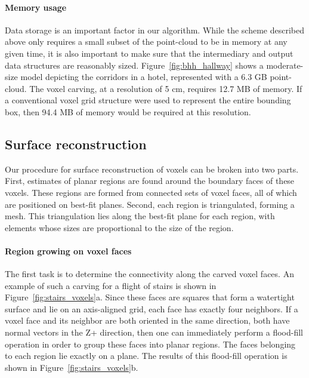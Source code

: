 \documentclass[10pt,twocolumn,letterpaper]{article}
\begin{document}
\paragraph*{Memory usage}

Data storage is an important factor in our algorithm.  While the scheme described above only requires a small subset of the point-cloud to be in memory at any given time, it is also important to make sure that the intermediary and output data structures are reasonably sized.  Figure~\ref{fig:bhh_hallway} shows a moderate-size model depicting the corridors in a hotel, represented with a 6.3 GB point-cloud.  The voxel carving, at a resolution of 5 cm, requires 12.7 MB of memory.  If a conventional voxel grid structure were used to represent the entire bounding box, then 94.4 MB of memory would be required at this resolution.

\subsection{Surface reconstruction}
\label{sec:surface}


Our procedure for surface reconstruction of voxels can be broken into two parts.  First, estimates of planar regions are found around the boundary faces of these voxels.  These regions are formed from connected sets of voxel faces, all of which are positioned on best-fit planes.  Second, each region is triangulated, forming a mesh.  This triangulation lies along the best-fit plane for each region, with elements whose sizes are proportional to the size of the region.

\paragraph*{Region growing on voxel faces}

The first task is to determine the connectivity along the carved voxel faces. An example of such a carving for a flight of stairs is shown in Figure~\ref{fig:stairs_voxels}a.  Since these faces are squares that form a watertight surface and lie on an axis-aligned grid, each face has exactly four neighbors.  If a voxel face and its neighbor are both oriented in the same direction, \eg both have normal vectors in the Z+ direction, then one can immediately perform a flood-fill operation in order to group these faces into planar regions.  The faces belonging to each region lie exactly on a plane.  The results of this flood-fill operation is shown in Figure~\ref{fig:stairs_voxels}b.
\end{document}
